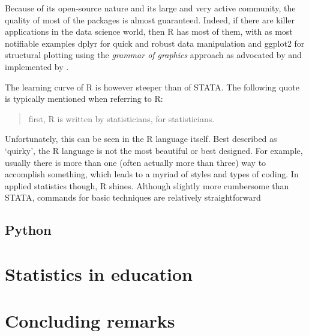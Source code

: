 \documentclass[fleqn,10pt]{SelfArx} %
\begin{document}
Because of its open-source nature and its large and very active community, the quality of most of the packages is almost guaranteed. Indeed, if there are killer applications in the data science world, then R has most of them, with as most notifiable examples dplyr for quick and robust data manipulation and ggplot2 for structural plotting using the \textit{grammar of graphics} approach as advocated by \citet{wilkinson2006grammar} and implemented by \citet{wickham2013implementation}. 

The learning curve of R is however steeper than of STATA. The following quote is typically mentioned when referring to R:
\begin{quote}
	first, R is written by statisticians, for statisticians.
\end{quote}
Unfortunately, this can be seen in the R language itself. Best described as `quirky', the R language is not the most beautiful or best designed. For example, usually there is more than one (often actually more than three) way to accomplish something, which leads to a myriad of styles and types of coding. In applied statistics though, R shines. Although slightly more cumbersome than STATA, commands for basic techniques are relatively straightforward 

\subsection*{Python}

\section*{Statistics in education}

\section*{Concluding remarks}


\printbibliography

\end{document}
